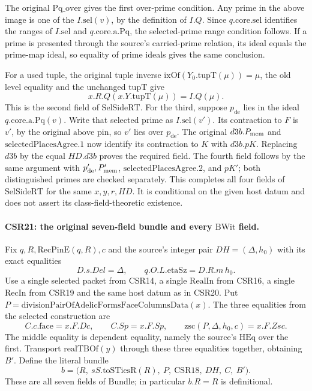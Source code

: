 The original \(\mathrm{Pq\_over}\) gives the first
over-prime condition. Any prime in the above image is
one of the \(I.\mathrm{sel}(v)\), by the definition of
\(I.Q\). Since \(q.\mathrm{core.sel}\) identifies the
ranges of \(I.\mathrm{sel}\) and \(q.\mathrm{core.a.Pq}\),
the selected-prime range condition follows. If a prime
is presented through the source's carried-prime relation,
its ideal equals the prime-map ideal, so equality of
prime ideals gives the same conclusion.

For a used tuple, the original tuple inverse
\(\mathrm{ixOf}(Y_0.\mathrm{tupT}(\mu))=\mu\),
the old level equality and the unchanged \(\mathrm{tupT}\)
give
\[
 x.R.Q(x.Y.\mathrm{tupT}(\mu))=I.Q(\mu).
 \tag{CSR.43}
\]
This is the second field of \(\mathrm{SelSideRT}\).
For the third, suppose \(p_{\mathrm{de}}\) lies in
the ideal \(q.\mathrm{core.a.Pq}(v)\). Write that
selected prime as \(I.\mathrm{sel}(v')\).
Its contraction to \(F\) is \(v'\), by the original
\(\mathrm{above}\) pin, so \(v'\) lies over
\(p_{\mathrm{de}}\). The original \(d3b.P_{\rm mem}\)
and \(\mathrm{selectedPlacesAgree}.1\) now identify its
contraction to \(K\) with \(d3b.pK\). Replacing
\(d3b\) by the equal \(HD.d3b\) proves the required field.
The fourth field follows by the same argument with
\(p'_{\mathrm{de}},P'_{\rm mem}\),
\(\mathrm{selectedPlacesAgree}.2\), and \(pK'\);
both distinguished primes are checked separately.
This completes all four fields of \(\mathrm{SelSideRT}\)
for the same \(x,y,r,HD\). It is conditional on the given
host datum and does not assert its class-field-theoretic
existence.

\paragraph{CSR21: the original seven-field bundle and every \(\mathrm{BWit}\) field.}
\label{claim:CSR21}
Fix \(q,R,\mathrm{RecPinE}(q,R),c\) and the source's
integer pair \(DH=(\Delta,h_0)\) with its exact equalities
\[
 D.s.Del=\Delta,\qquad q.O.L.\mathrm{etaSz}=D.R.m\,h_0.
 \tag{CSR.44}
\]
Use a single selected packet from CSR14, a single
\(\mathrm{RealIn}\) from CSR16, a single \(\mathrm{RecIn}\)
from CSR19 and the same host datum as in CSR20.
Put \(P=\mathrm{divisionPairOfAdelicFormsFaceColumnsData}(x)\).
The three equalities from the selected construction are
\[
 C.c.\mathrm{face}=x.F.Dc,\qquad
 C.Sp=x.F.Sp,\qquad
 \mathrm{zsc}(P,\Delta,h_0,c)=x.F.Zsc.
 \tag{CSR.45}
\]
The middle equality is dependent equality, namely the
source's \(\mathrm{HEq}\) over the first. Transport
\(\mathrm{realTBOf}(y)\) through these three equalities
together, obtaining \(B'\). Define the literal bundle
\[
 b=\bigl(R,\ sS.\mathrm{toSTiesR}(R),\
             P,\ \mathrm{CSR18},\ DH,\ C,\ B'\bigr).
 \tag{CSR.46}
\]
These are all seven fields of \(\mathrm{Bundle}\);
in particular \(b.R=R\) is definitional.

